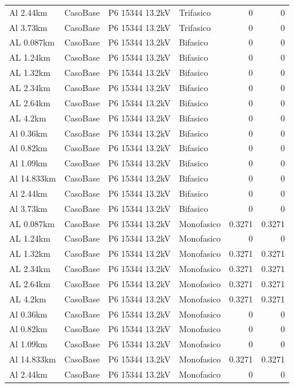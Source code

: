 \documentclass[11pt,a4paper]{article}
\begin{document}
\begin{longtable}{llllrr}
Al 2.44km & CasoBase & P6 15344 13.2kV & Trifasico & 0 & 0 \\
Al 3.73km & CasoBase & P6 15344 13.2kV & Trifasico & 0 & 0 \\
AL 0.087km & CasoBase & P6 15344 13.2kV & Bifasico & 0 & 0 \\
AL 1.24km & CasoBase & P6 15344 13.2kV & Bifasico & 0 & 0 \\
AL 1.32km & CasoBase & P6 15344 13.2kV & Bifasico & 0 & 0 \\
AL 2.34km & CasoBase & P6 15344 13.2kV & Bifasico & 0 & 0 \\
AL 2.64km & CasoBase & P6 15344 13.2kV & Bifasico & 0 & 0 \\
AL 4.2km & CasoBase & P6 15344 13.2kV & Bifasico & 0 & 0 \\
Al 0.36km & CasoBase & P6 15344 13.2kV & Bifasico & 0 & 0 \\
Al 0.82km & CasoBase & P6 15344 13.2kV & Bifasico & 0 & 0 \\
Al 1.09km & CasoBase & P6 15344 13.2kV & Bifasico & 0 & 0 \\
Al 14.833km & CasoBase & P6 15344 13.2kV & Bifasico & 0 & 0 \\
Al 2.44km & CasoBase & P6 15344 13.2kV & Bifasico & 0 & 0 \\
Al 3.73km & CasoBase & P6 15344 13.2kV & Bifasico & 0 & 0 \\
AL 0.087km & CasoBase & P6 15344 13.2kV & Monofasico & 0.3271 & 0.3271 \\
AL 1.24km & CasoBase & P6 15344 13.2kV & Monofasico & 0 & 0 \\
AL 1.32km & CasoBase & P6 15344 13.2kV & Monofasico & 0.3271 & 0.3271 \\
AL 2.34km & CasoBase & P6 15344 13.2kV & Monofasico & 0.3271 & 0.3271 \\
AL 2.64km & CasoBase & P6 15344 13.2kV & Monofasico & 0.3271 & 0.3271 \\
AL 4.2km & CasoBase & P6 15344 13.2kV & Monofasico & 0.3271 & 0.3271 \\
Al 0.36km & CasoBase & P6 15344 13.2kV & Monofasico & 0 & 0 \\
Al 0.82km & CasoBase & P6 15344 13.2kV & Monofasico & 0 & 0 \\
Al 1.09km & CasoBase & P6 15344 13.2kV & Monofasico & 0 & 0 \\
Al 14.833km & CasoBase & P6 15344 13.2kV & Monofasico & 0.3271 & 0.3271 \\
Al 2.44km & CasoBase & P6 15344 13.2kV & Monofasico & 0 & 0 \\

\end{longtable}
\end{document}
